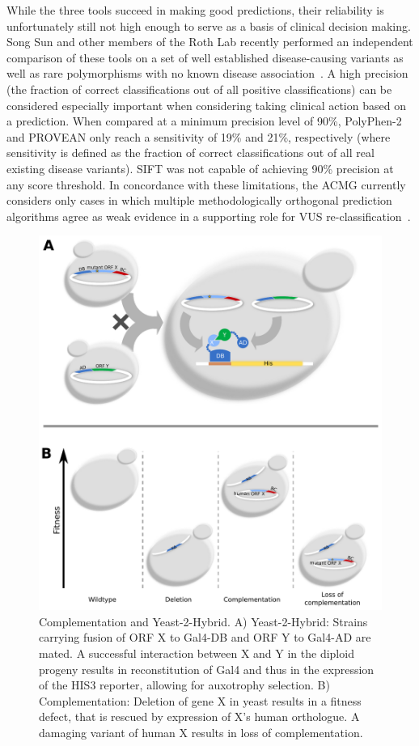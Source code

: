 While the three tools succeed in making good predictions, their reliability is unfortunately still not high enough to serve as a basis of clinical decision making. Song Sun and other members of the Roth Lab recently performed an independent comparison of these tools on a set of well established disease-causing variants as well as rare polymorphisms with no known disease association~\cite{sun_extended_2016}. A high precision (the fraction of correct classifications out of all positive classifications) can be considered especially important when considering taking clinical action based on a prediction. When compared at a minimum precision level of 90\%, PolyPhen-2 and PROVEAN only reach a sensitivity of 19\% and 21\%, respectively (where sensitivity is defined as the fraction of correct classifications out of all real existing disease variants). SIFT was not capable of achieving 90\% precision at any score threshold. In concordance with these limitations, the ACMG currently considers only cases in which multiple methodologically orthogonal prediction algorithms agree as weak evidence in a supporting role for VUS re-classification~\cite{richards_standards_2015}.

\begin{figure}[h!]
	\centering
	\includegraphics[width=\textwidth]{img/compl_y2h.pdf}
	\caption{Complementation and Yeast-2-Hybrid. A) Yeast-2-Hybrid: Strains carrying fusion of ORF X to Gal4-DB and ORF Y to Gal4-AD are mated. A successful interaction between X and Y in the diploid progeny results in reconstitution of Gal4 and thus in the expression of the HIS3 reporter, allowing for auxotrophy selection. B) Complementation: Deletion of gene X in yeast results in a fitness defect, that is rescued by expression of X's human orthologue. A damaging variant of human X results in loss of complementation.}
	\label{fig:compl_y2h}
\end{figure}

